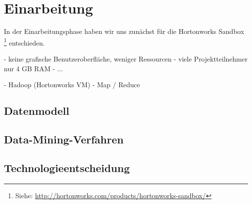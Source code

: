 \section{Einarbeitung}
In der Einarbeitungsphase haben wir uns zunächst für die Hortonworks Sandbox \footnote{Siehe: \url{http://hortonworks.com/products/hortonworks-sandbox/}} entschieden. 

- keine grafische Benutzeroberfläche, weniger Ressourcen
- viele Projektteilnehmer nur 4 GB RAM
- ...

- Hadoop (Hortonworks VM)
- Map / Reduce

\subsection{Datenmodell}

\subsection{Data-Mining-Verfahren}

\subsection{Technologieentscheidung}
